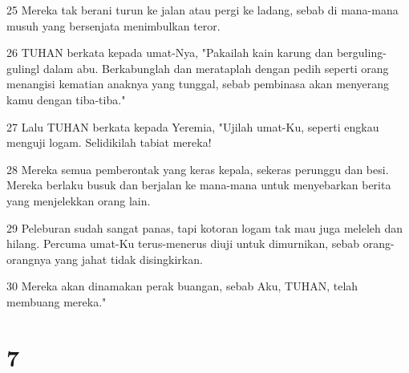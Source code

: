 \par 25 Mereka tak berani turun ke jalan atau pergi ke ladang, sebab di mana-mana musuh yang bersenjata menimbulkan teror.
\par 26 TUHAN berkata kepada umat-Nya, "Pakailah kain karung dan berguling-gulingl dalam abu. Berkabunglah dan merataplah dengan pedih seperti orang menangisi kematian anaknya yang tunggal, sebab pembinasa akan menyerang kamu dengan tiba-tiba."
\par 27 Lalu TUHAN berkata kepada Yeremia, "Ujilah umat-Ku, seperti engkau menguji logam. Selidikilah tabiat mereka!
\par 28 Mereka semua pemberontak yang keras kepala, sekeras perunggu dan besi. Mereka berlaku busuk dan berjalan ke mana-mana untuk menyebarkan berita yang menjelekkan orang lain.
\par 29 Peleburan sudah sangat panas, tapi kotoran logam tak mau juga meleleh dan hilang. Percuma umat-Ku terus-menerus diuji untuk dimurnikan, sebab orang-orangnya yang jahat tidak disingkirkan.
\par 30 Mereka akan dinamakan perak buangan, sebab Aku, TUHAN, telah membuang mereka."

\chapter{7}

